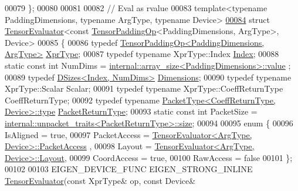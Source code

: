 \begin{DoxyCode}
00079 \};
00080 
00081 
00082 \textcolor{comment}{// Eval as rvalue}
00083 \textcolor{keyword}{template}<\textcolor{keyword}{typename} PaddingDimensions, \textcolor{keyword}{typename} ArgType, \textcolor{keyword}{typename} Device>
\hyperlink{struct_eigen_1_1_tensor_evaluator_3_01const_01_tensor_padding_op_3_01_padding_dimensions_00_01_arg_type_01_4_00_01_device_01_4}{00084} \textcolor{keyword}{struct }\hyperlink{struct_eigen_1_1_tensor_evaluator}{TensorEvaluator}<const \hyperlink{class_eigen_1_1_tensor_padding_op}{TensorPaddingOp}<PaddingDimensions, ArgType>, 
      Device>
00085 \{
00086   \textcolor{keyword}{typedef} \hyperlink{class_eigen_1_1_tensor_padding_op}{TensorPaddingOp<PaddingDimensions, ArgType>} 
      \hyperlink{class_eigen_1_1_tensor_padding_op}{XprType};
00087   \textcolor{keyword}{typedef} \textcolor{keyword}{typename} XprType::Index \hyperlink{namespace_eigen_a62e77e0933482dafde8fe197d9a2cfde}{Index};
00088   \textcolor{keyword}{static} \textcolor{keyword}{const} \textcolor{keywordtype}{int} NumDims = \hyperlink{struct_eigen_1_1internal_1_1array__size}{internal::array\_size<PaddingDimensions>::value}
      ;
00089   \textcolor{keyword}{typedef} \hyperlink{struct_eigen_1_1_d_sizes}{DSizes<Index, NumDims>} \hyperlink{struct_eigen_1_1_d_sizes}{Dimensions};
00090   \textcolor{keyword}{typedef} \textcolor{keyword}{typename} XprType::Scalar Scalar;
00091   \textcolor{keyword}{typedef} \textcolor{keyword}{typename} XprType::CoeffReturnType CoeffReturnType;
00092   \textcolor{keyword}{typedef} \textcolor{keyword}{typename} \hyperlink{group___sparse_core___module}{PacketType<CoeffReturnType, Device>::type} 
      \hyperlink{group___sparse_core___module}{PacketReturnType};
00093   \textcolor{keyword}{static} \textcolor{keyword}{const} \textcolor{keywordtype}{int} PacketSize = 
      \hyperlink{struct_eigen_1_1internal_1_1unpacket__traits}{internal::unpacket\_traits<PacketReturnType>::size};
00094 
00095   \textcolor{keyword}{enum} \{
00096     IsAligned = \textcolor{keyword}{true},
00097     PacketAccess = \hyperlink{struct_eigen_1_1_tensor_evaluator}{TensorEvaluator<ArgType, Device>::PacketAccess}
      ,
00098     Layout = \hyperlink{struct_eigen_1_1_tensor_evaluator}{TensorEvaluator<ArgType, Device>::Layout},
00099     CoordAccess = \textcolor{keyword}{true},
00100     RawAccess = \textcolor{keyword}{false}
00101   \};
00102 
00103   EIGEN\_DEVICE\_FUNC EIGEN\_STRONG\_INLINE \hyperlink{struct_eigen_1_1_tensor_evaluator}{TensorEvaluator}(\textcolor{keyword}{const} XprType& op, \textcolor{keyword}{const} Device& 

\end{DoxyCode}
